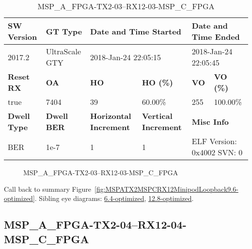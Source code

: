 \begin{table}[h]
\centering
\caption{MSP\_A\_FPGA-TX2-03--RX12-03-MSP\_C\_FPGA}
\label{tab:MSPAFPGATX203RX1203MSPCFPGA9.6-optimized}
\begin{tabular}{@{}|l|l|l|l|l|l|@{}}
\toprule
\textbf{SW Version}                & \textbf{GT Type}   & \multicolumn{2}{l|}{\textbf{Date and Time Started}}            & \multicolumn{2}{l|}{\textbf{Date and Time Ended}}        \\ \midrule
2017.2                       & UltraScale GTY          & \multicolumn{2}{l|}{2018-Jan-24 22:05:15}                   & \multicolumn{2}{l|}{2018-Jan-24 22:05:45}               \\ \midrule
\textbf{Reset RX}                  & \textbf{OA} & \textbf{HO}   & \textbf{HO (\%)} & \textbf{VO} & \textbf{VO (\%)} \\ \midrule
true & 7404        & 39          & 60.00\%        & 255        & 100.00\%       \\ \midrule
\textbf{Dwell Type}                & \textbf{Dwell BER} & \textbf{Horizontal Increment} & \textbf{Vertical Increment}    & \multicolumn{2}{l|}{\textbf{Misc Info}}                  \\ \midrule
BER                            & 1e-7        & 1        & 1           & \multicolumn{2}{l|}{ELF Version: 0x4002 SVN: 0}                         \\ \bottomrule
\end{tabular}
\end{table}

\begin{figure}[h]
\caption{MSP\_A\_FPGA-TX2-03--RX12-03-MSP\_C\_FPGA} \label{fig:MSPAFPGATX203RX1203MSPCFPGA9.6-optimized}
\end{figure}

Call back to summary Figure~\ref{fig:MSPATX2MSPCRX12MinipodLoopback9.6-optimized}.
Sibling eye diagrams: \hyperref[sec:MSPAFPGATX203RX1203MSPCFPGA6.4-optimized]{6.4-optimized}, \hyperref[sec:MSPAFPGATX203RX1203MSPCFPGA12.8-optimized]{12.8-optimized}.

\clearpage
\newpage


\subsection{MSP\_A\_FPGA-TX2-04--RX12-04-MSP\_C\_FPGA}\label{sec:MSPAFPGATX204RX1204MSPCFPGA9.6-optimized}

